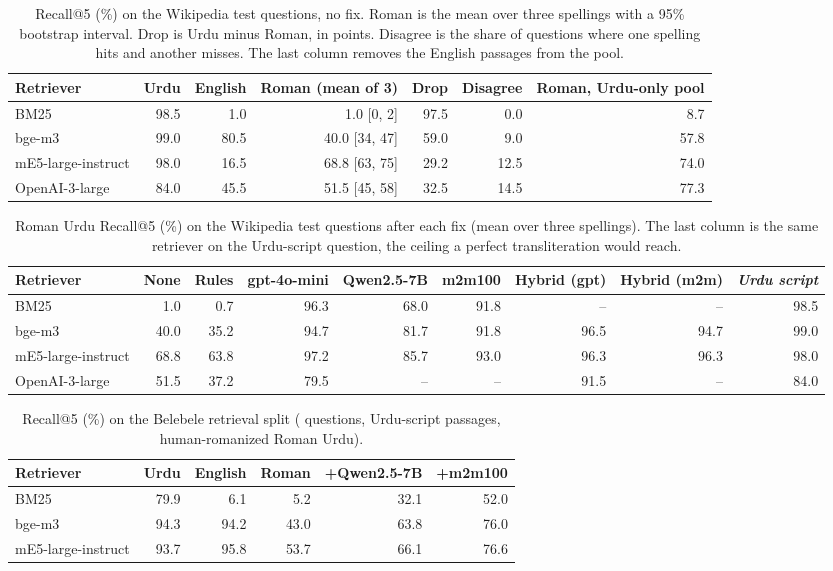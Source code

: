 \begin{table}[t]\centering\small
\begin{tabular}{lrrrrrr}\toprule
Retriever & Urdu & English & Roman (mean of 3) & Drop & Disagree & Roman, Urdu-only pool \\
\midrule
BM25 & 98.5 & 1.0 & 1.0 {\scriptsize [0, 2]} & 97.5 & 0.0 & 8.7 \\
bge-m3 & 99.0 & 80.5 & 40.0 {\scriptsize [34, 47]} & 59.0 & 9.0 & 57.8 \\
mE5-large-instruct & 98.0 & 16.5 & 68.8 {\scriptsize [63, 75]} & 29.2 & 12.5 & 74.0 \\
OpenAI-3-large & 84.0 & 45.5 & 51.5 {\scriptsize [45, 58]} & 32.5 & 14.5 & 77.3 \\
\bottomrule\end{tabular}
\caption{Recall@5 (\%) on the \WikiNTest{} Wikipedia test questions, no fix. Roman is the mean over three spellings with a 95\% bootstrap interval. Drop is Urdu minus Roman, in points. Disagree is the share of questions where one spelling hits and another misses. The last column removes the English passages from the pool.}\label{tab:wiki}
\end{table}

\begin{table}[t]\centering\small
\begin{tabular}{lrrrrrrrr}\toprule
Retriever & None & Rules & gpt-4o-mini & Qwen2.5-7B & m2m100 & Hybrid (gpt) & Hybrid (m2m) & \textit{Urdu script} \\
\midrule
BM25 & 1.0 & 0.7 & 96.3 & 68.0 & 91.8 & -- & -- & 98.5 \\
bge-m3 & 40.0 & 35.2 & 94.7 & 81.7 & 91.8 & 96.5 & 94.7 & 99.0 \\
mE5-large-instruct & 68.8 & 63.8 & 97.2 & 85.7 & 93.0 & 96.3 & 96.3 & 98.0 \\
OpenAI-3-large & 51.5 & 37.2 & 79.5 & -- & -- & 91.5 & -- & 84.0 \\
\bottomrule\end{tabular}
\caption{Roman Urdu Recall@5 (\%) on the Wikipedia test questions after each fix (mean over three spellings). The last column is the same retriever on the Urdu-script question, the ceiling a perfect transliteration would reach.}\label{tab:fixes}
\end{table}

\begin{table}[t]\centering\small
\begin{tabular}{lrrrrr}\toprule
Retriever & Urdu & English & Roman & +Qwen2.5-7B & +m2m100 \\
\midrule
BM25 & 79.9 & 6.1 & 5.2 & 32.1 & 52.0 \\
bge-m3 & 94.3 & 94.2 & 43.0 & 63.8 & 76.0 \\
mE5-large-instruct & 93.7 & 95.8 & 53.7 & 66.1 & 76.6 \\
\bottomrule\end{tabular}
\caption{Recall@5 (\%) on the Belebele retrieval split (\BbNQueries{} questions, \BbNPassages{} Urdu-script passages, human-romanized Roman Urdu).}\label{tab:belebele}
\end{table}

